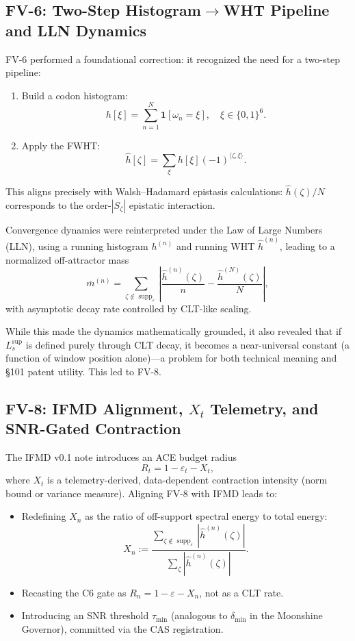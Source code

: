 \documentclass[11pt]{article}
\begin{document}
\subsection{FV-6: Two-Step Histogram$\to$WHT Pipeline and LLN Dynamics}

FV-6 performed a foundational correction: it recognized the need for a two-step pipeline:

\begin{enumerate}[nosep]
  \item Build a codon histogram:
  \[
  h[\xi] = \sum_{n=1}^N \mathbf{1}[\omega_n = \xi], \quad \xi \in \{0,1\}^6.
  \]
  \item Apply the FWHT:
  \[
  \hat{h}[\zeta] = \sum_{\xi} h[\xi] (-1)^{\langle \zeta, \xi\rangle}.
  \]
\end{enumerate}

This aligns precisely with Walsh--Hadamard epistasis calculations: $\hat{h}(\zeta)/N$ corresponds to the order-$|S_\zeta|$ epistatic interaction.

Convergence dynamics were reinterpreted under the Law of Large Numbers (LLN), using a running histogram $h^{(n)}$ and running WHT $\hat{h}^{(n)}$, leading to a normalized off-attractor mass
\[
\bar{m}^{(n)} = \sum_{\zeta \not\in \operatorname{supp}_\varepsilon}
\left|
\frac{\hat{h}^{(n)}(\zeta)}{n} - \frac{\hat{h}^{(N)}(\zeta)}{N}
\right|,
\]
with asymptotic decay rate controlled by CLT-like scaling.

While this made the dynamics mathematically grounded, it also revealed that if $L_s^{\sup}$ is defined purely through CLT decay, it becomes a near-universal constant (a function of window position alone)—a problem for both technical meaning and §101 patent utility. This led to FV-8.

\subsection{FV-8: IFMD Alignment, $X_t$ Telemetry, and SNR-Gated Contraction}

The IFMD v0.1 note introduces an ACE budget radius
\[
R_t = 1 - \varepsilon_t - X_t,
\]
where $X_t$ is a telemetry-derived, data-dependent contraction intensity (norm bound or variance measure). Aligning FV-8 with IFMD leads to:

\begin{itemize}[nosep]
  \item Redefining $X_n$ as the ratio of off-support spectral energy to total energy:
  \[
  X_n := \frac{\sum_{\zeta \not\in \operatorname{supp}_\varepsilon} |\hat{h}^{(n)}(\zeta)|}
               {\sum_{\zeta} |\hat{h}^{(n)}(\zeta)|}.
  \]
  \item Recasting the C6 gate as $R_n = 1 - \varepsilon - X_n$, not as a CLT rate.
  \item Introducing an SNR threshold $\tau_{\min}$ (analogous to $\delta_{\min}$ in the Moonshine Governor), committed via the CAS registration.
\end{itemize}
\end{document}
